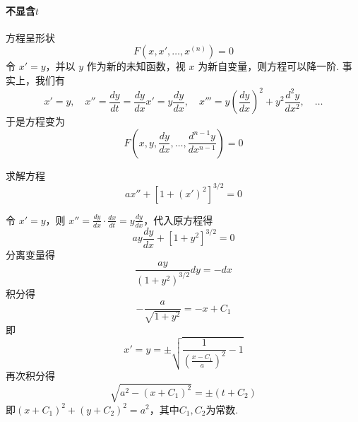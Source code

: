 \paragraph{不显含$t$}
方程呈形状
$$
    F(x,x',\dots,x^{(n)})=0
$$
令 $\displaystyle x'=y$，并以 $\displaystyle y$ 作为新的未知函数，视 $x$ 为新自变量，则方程可以降一阶. 事实上，我们有
$$
    x'=y,\quad x''=\frac{dy}{dt}=\frac{dy}{dx}x'=y\frac{dy}{dx},\quad x'''=y\left( \frac{dy}{dx} \right)^{2}+y^{2}\frac{d^{2}y}{dx^{2}},\quad \dots
$$
于是方程变为
$$
    F\left( x,y,\frac{dy}{dx},\dots,\frac{d^{n-1}y}{dx^{n-1}} \right)=0
$$
\begin{exercise}
    求解方程
    \[
        ax''+\left[1+\left(x'\right)^2\right]^{3/2}=0
    \]
\end{exercise}
\begin{solution}
    令 $x'=y$，则 $x''=\frac{dy}{dx}\cdot\frac{dx}{dt}=y\frac{dy}{dx}$，代入原方程得
    \[
        ay\frac{dy}{dx}+\left[1+y^2\right]^{3/2}=0
    \]
    分离变量得
    \[
        \frac{ay}{(1+y^2)^{3/2}}dy=-dx
    \]
    积分得
    \[
        -\frac{a}{\sqrt{1+y^2}}=-x+C_1
    \]
    即
    \[
        x'=y=\pm\sqrt{\frac{1}{(\frac{x-C_1}{a})^2}-1}
    \]
    再次积分得
    \[
        \sqrt{a^2-(x+C_1)^2}=\pm (t+C_2)
    \]
    即$(x+C_1)^2+(y+C_2)^2=a^2$，其中$C_1,C_2$为常数.
\end{solution}
